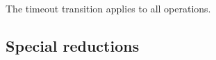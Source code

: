 \documentclass[a4paper]{llncs}
\begin{document}
\begin{mathpar}
\end{mathpar}

The timeout transition applies to all operations.
\begin{mathpar}
\end{mathpar}


\subsection{Special reductions}
\label{sec:special-reductions}
\end{document}
